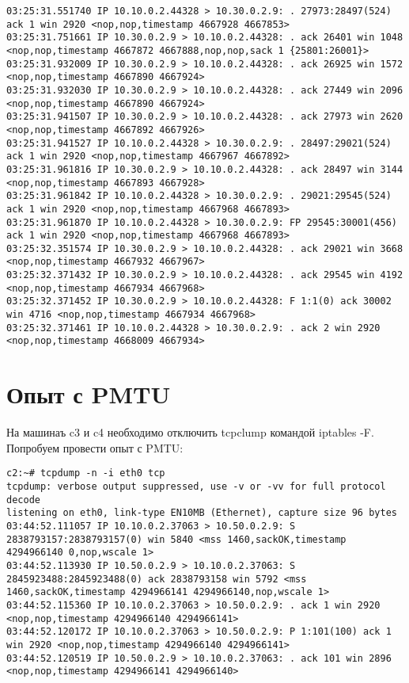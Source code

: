 \documentclass[a4paper,12pt]{article}
\begin{document}
\begin{Verbatim}
03:25:31.551740 IP 10.10.0.2.44328 > 10.30.0.2.9: . 27973:28497(524) ack 1 win 2920 <nop,nop,timestamp 4667928 4667853>
03:25:31.751661 IP 10.30.0.2.9 > 10.10.0.2.44328: . ack 26401 win 1048 <nop,nop,timestamp 4667872 4667888,nop,nop,sack 1 {25801:26001}>
03:25:31.932009 IP 10.30.0.2.9 > 10.10.0.2.44328: . ack 26925 win 1572 <nop,nop,timestamp 4667890 4667924>
03:25:31.932030 IP 10.30.0.2.9 > 10.10.0.2.44328: . ack 27449 win 2096 <nop,nop,timestamp 4667890 4667924>
03:25:31.941507 IP 10.30.0.2.9 > 10.10.0.2.44328: . ack 27973 win 2620 <nop,nop,timestamp 4667892 4667926>
03:25:31.941527 IP 10.10.0.2.44328 > 10.30.0.2.9: . 28497:29021(524) ack 1 win 2920 <nop,nop,timestamp 4667967 4667892>
03:25:31.961816 IP 10.30.0.2.9 > 10.10.0.2.44328: . ack 28497 win 3144 <nop,nop,timestamp 4667893 4667928>
03:25:31.961842 IP 10.10.0.2.44328 > 10.30.0.2.9: . 29021:29545(524) ack 1 win 2920 <nop,nop,timestamp 4667968 4667893>
03:25:31.961870 IP 10.10.0.2.44328 > 10.30.0.2.9: FP 29545:30001(456) ack 1 win 2920 <nop,nop,timestamp 4667968 4667893>
03:25:32.351574 IP 10.30.0.2.9 > 10.10.0.2.44328: . ack 29021 win 3668 <nop,nop,timestamp 4667932 4667967>
03:25:32.371432 IP 10.30.0.2.9 > 10.10.0.2.44328: . ack 29545 win 4192 <nop,nop,timestamp 4667934 4667968>
03:25:32.371452 IP 10.30.0.2.9 > 10.10.0.2.44328: F 1:1(0) ack 30002 win 4716 <nop,nop,timestamp 4667934 4667968>
03:25:32.371461 IP 10.10.0.2.44328 > 10.30.0.2.9: . ack 2 win 2920 <nop,nop,timestamp 4668009 4667934>
\end{Verbatim}

\section{Опыт с PMTU}

На машинаъ c3 и c4 необходимо отключить tcpclump командой iptables -F.
Попробуем провести опыт с PMTU:


\begin{Verbatim}
c2:~# tcpdump -n -i eth0 tcp
tcpdump: verbose output suppressed, use -v or -vv for full protocol decode
listening on eth0, link-type EN10MB (Ethernet), capture size 96 bytes
03:44:52.111057 IP 10.10.0.2.37063 > 10.50.0.2.9: S 2838793157:2838793157(0) win 5840 <mss 1460,sackOK,timestamp 4294966140 0,nop,wscale 1>
03:44:52.113930 IP 10.50.0.2.9 > 10.10.0.2.37063: S 2845923488:2845923488(0) ack 2838793158 win 5792 <mss 1460,sackOK,timestamp 4294966141 4294966140,nop,wscale 1>
03:44:52.115360 IP 10.10.0.2.37063 > 10.50.0.2.9: . ack 1 win 2920 <nop,nop,timestamp 4294966140 4294966141>
03:44:52.120172 IP 10.10.0.2.37063 > 10.50.0.2.9: P 1:101(100) ack 1 win 2920 <nop,nop,timestamp 4294966140 4294966141>
03:44:52.120519 IP 10.50.0.2.9 > 10.10.0.2.37063: . ack 101 win 2896 <nop,nop,timestamp 4294966141 4294966140>
\end{Verbatim}
\end{document}
